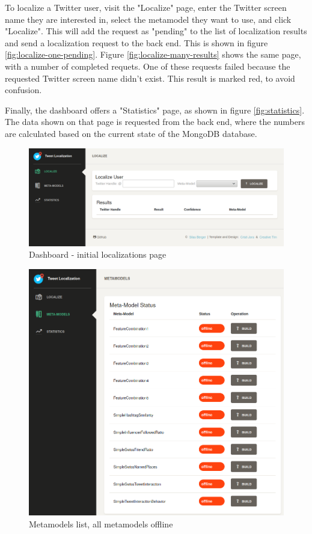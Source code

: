 \documentclass[10pt,a4paper]{article}
\begin{document}
To localize a Twitter user, visit the "Localize" page, enter the Twitter screen name they are interested in, select the metamodel they want to use, and click "Localize". This will add the request as "pending" to the list of localization results and send a localization request to the back end. This is shown in figure \ref{fig:localize-one-pending}. Figure \ref{fig:localize-many-results} shows the same page, with a number of completed requets. One of these requests failed because the requested Twitter screen name didn't exist. This result is marked red, to avoid confusion.

Finally, the dashboard offers a "Statistics" page, as shown in figure \ref{fig:statistics}. The data shown on that page is requested from the back end, where the numbers are calculated based on the current state of the MongoDB database.

\begin{figure}
	\centering
	\includegraphics[scale=0.30]{localize-initial}
	\caption{Dashboard - initial localizations page}
	\label{fig:localize-initial}
\end{figure}

\begin{figure}
	\centering
	\includegraphics[scale=0.3]{metamodels-initial}
	\caption{Metamodels list, all metamodels offline}
	\label{fig:metamodels-initial}
\end{figure}
\end{document}
